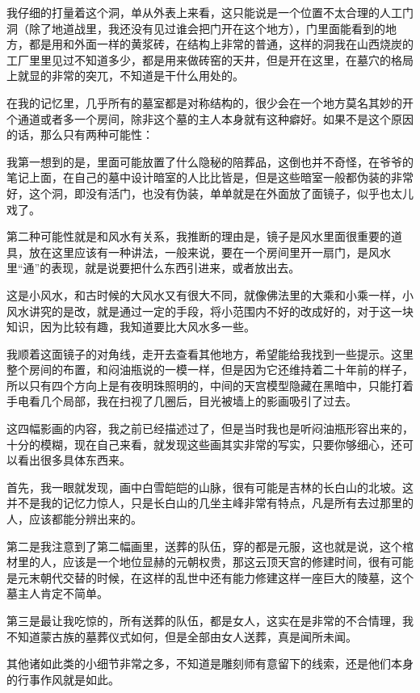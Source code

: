 我仔细的打量着这个洞，单从外表上来看，这只能说是一个位置不太合理的人工门洞（除了地道战里，我还没有见过谁会把门开在这个地方），门里面能看到的地方，都是用和外面一样的黄浆砖，在结构上非常的普通，这样的洞我在山西烧炭的工厂里里见过不知道多少，都是用来做砖窑的天井，但是开在这里，在墓穴的格局上就显的非常的突兀，不知道是干什么用处的。

在我的记忆里，几乎所有的墓室都是对称结构的，很少会在一个地方莫名其妙的开个通道或者多一个房间，除非这个墓的主人本身就有这种癖好。如果不是这个原因的话，那么只有两种可能性：

我第一想到的是，里面可能放置了什么隐秘的陪葬品，这倒也并不奇怪，在爷爷的笔记上面，在自己的墓中设计暗室的人比比皆是，但是这些暗室一般都伪装的非常好，这个洞，即没有活门，也没有伪装，单单就是在外面放了面镜子，似乎也太儿戏了。

第二种可能性就是和风水有关系，我推断的理由是，镜子是风水里面很重要的道具，放在这里应该有一种讲法，一般来说，要在一个房间里开一扇门，是风水里“通”的表现，就是说要把什么东西引进来，或者放出去。

这是小风水，和古时候的大风水又有很大不同，就像佛法里的大乘和小乘一样，小风水讲究的是改，就是通过一定的手段，将小范围内不好的改成好的，对于这一块知识，因为比较有趣，我知道要比大风水多一些。

我顺着这面镜子的对角线，走开去查看其他地方，希望能给我找到一些提示。这里整个房间的布置，和闷油瓶说的一模一样，但是因为它还维持着二十年前的样子，所以只有四个方向上是有夜明珠照明的，中间的天宫模型隐藏在黑暗中，只能打着手电看几个局部，我在扫视了几圈后，目光被墙上的影画吸引了过去。

这四幅影画的内容，我之前已经描述过了，但是当时我也是听闷油瓶形容出来的，十分的模糊，现在自己来看，就发现这些画其实非常的写实，只要你够细心，还可以看出很多具体东西来。

首先，我一眼就发现，画中白雪皑皑的山脉，很有可能是吉林的长白山的北坡。这并不是我的记忆力惊人，只是长白山的几坐主峰非常有特点，凡是所有去过那里的人，应该都能分辨出来的。

第二是我注意到了第二幅画里，送葬的队伍，穿的都是元服，这也就是说，这个棺材里的人，应该是一个地位显赫的元朝权贵，那这云顶天宫的修建时间，很有可能是元末朝代交替的时候，在这样的乱世中还有能力修建这样一座巨大的陵墓，这个墓主人肯定不简单。

第三是最让我吃惊的，所有送葬的队伍，都是女人，这实在是非常的不合情理，我不知道蒙古族的墓葬仪式如何，但是全部由女人送葬，真是闻所未闻。

其他诸如此类的小细节非常之多，不知道是雕刻师有意留下的线索，还是他们本身的行事作风就是如此。

